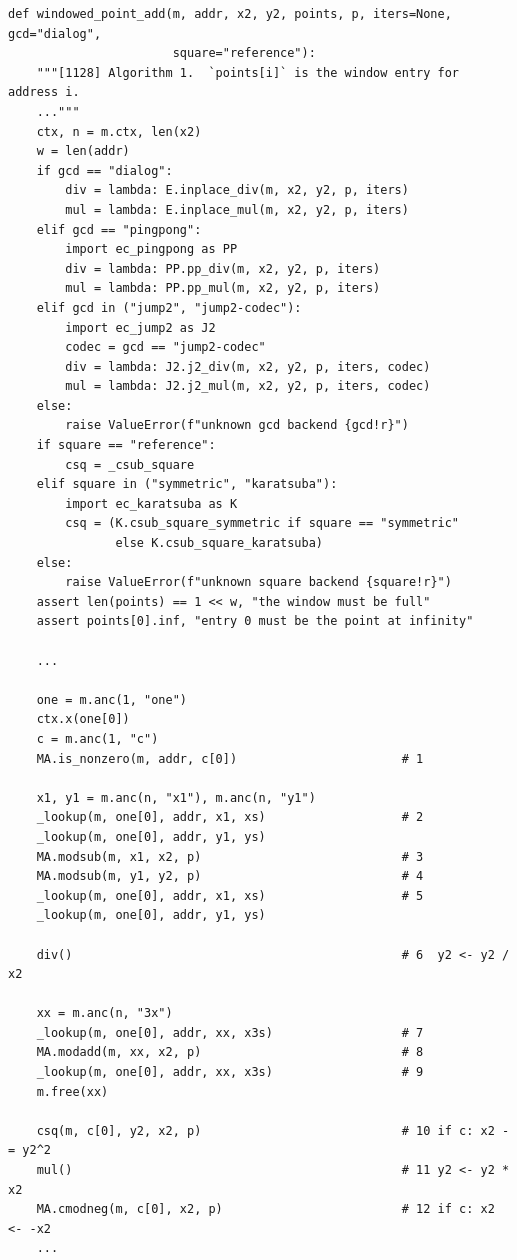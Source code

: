 \documentclass[11pt]{article}
\theoremstyle{plain}
\theoremstyle{remark}
\begin{document}
\begin{lstlisting}
def windowed_point_add(m, addr, x2, y2, points, p, iters=None, gcd="dialog",
                       square="reference"):
    """[1128] Algorithm 1.  `points[i]` is the window entry for address i.
    ..."""
    ctx, n = m.ctx, len(x2)
    w = len(addr)
    if gcd == "dialog":
        div = lambda: E.inplace_div(m, x2, y2, p, iters)
        mul = lambda: E.inplace_mul(m, x2, y2, p, iters)
    elif gcd == "pingpong":
        import ec_pingpong as PP
        div = lambda: PP.pp_div(m, x2, y2, p, iters)
        mul = lambda: PP.pp_mul(m, x2, y2, p, iters)
    elif gcd in ("jump2", "jump2-codec"):
        import ec_jump2 as J2
        codec = gcd == "jump2-codec"
        div = lambda: J2.j2_div(m, x2, y2, p, iters, codec)
        mul = lambda: J2.j2_mul(m, x2, y2, p, iters, codec)
    else:
        raise ValueError(f"unknown gcd backend {gcd!r}")
    if square == "reference":
        csq = _csub_square
    elif square in ("symmetric", "karatsuba"):
        import ec_karatsuba as K
        csq = (K.csub_square_symmetric if square == "symmetric"
               else K.csub_square_karatsuba)
    else:
        raise ValueError(f"unknown square backend {square!r}")
    assert len(points) == 1 << w, "the window must be full"
    assert points[0].inf, "entry 0 must be the point at infinity"

    ...

    one = m.anc(1, "one")
    ctx.x(one[0])
    c = m.anc(1, "c")
    MA.is_nonzero(m, addr, c[0])                       # 1

    x1, y1 = m.anc(n, "x1"), m.anc(n, "y1")
    _lookup(m, one[0], addr, x1, xs)                   # 2
    _lookup(m, one[0], addr, y1, ys)
    MA.modsub(m, x1, x2, p)                            # 3
    MA.modsub(m, y1, y2, p)                            # 4
    _lookup(m, one[0], addr, x1, xs)                   # 5
    _lookup(m, one[0], addr, y1, ys)

    div()                                              # 6  y2 <- y2 / x2

    xx = m.anc(n, "3x")
    _lookup(m, one[0], addr, xx, x3s)                  # 7
    MA.modadd(m, xx, x2, p)                            # 8
    _lookup(m, one[0], addr, xx, x3s)                  # 9
    m.free(xx)

    csq(m, c[0], y2, x2, p)                            # 10 if c: x2 -= y2^2
    mul()                                              # 11 y2 <- y2 * x2
    MA.cmodneg(m, c[0], x2, p)                         # 12 if c: x2 <- -x2
    ...
\end{lstlisting}
\end{document}
